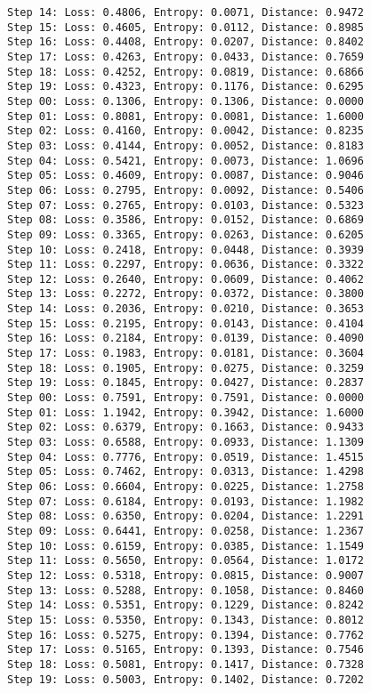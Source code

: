 \documentclass[11pt]{article}
\begin{document}
\begin{Verbatim}[commandchars=\\\{\}]
Step 14: Loss: 0.4806, Entropy: 0.0071, Distance: 0.9472
Step 15: Loss: 0.4605, Entropy: 0.0112, Distance: 0.8985
Step 16: Loss: 0.4408, Entropy: 0.0207, Distance: 0.8402
Step 17: Loss: 0.4263, Entropy: 0.0433, Distance: 0.7659
Step 18: Loss: 0.4252, Entropy: 0.0819, Distance: 0.6866
Step 19: Loss: 0.4323, Entropy: 0.1176, Distance: 0.6295
Step 00: Loss: 0.1306, Entropy: 0.1306, Distance: 0.0000
Step 01: Loss: 0.8081, Entropy: 0.0081, Distance: 1.6000
Step 02: Loss: 0.4160, Entropy: 0.0042, Distance: 0.8235
Step 03: Loss: 0.4144, Entropy: 0.0052, Distance: 0.8183
Step 04: Loss: 0.5421, Entropy: 0.0073, Distance: 1.0696
Step 05: Loss: 0.4609, Entropy: 0.0087, Distance: 0.9046
Step 06: Loss: 0.2795, Entropy: 0.0092, Distance: 0.5406
Step 07: Loss: 0.2765, Entropy: 0.0103, Distance: 0.5323
Step 08: Loss: 0.3586, Entropy: 0.0152, Distance: 0.6869
Step 09: Loss: 0.3365, Entropy: 0.0263, Distance: 0.6205
Step 10: Loss: 0.2418, Entropy: 0.0448, Distance: 0.3939
Step 11: Loss: 0.2297, Entropy: 0.0636, Distance: 0.3322
Step 12: Loss: 0.2640, Entropy: 0.0609, Distance: 0.4062
Step 13: Loss: 0.2272, Entropy: 0.0372, Distance: 0.3800
Step 14: Loss: 0.2036, Entropy: 0.0210, Distance: 0.3653
Step 15: Loss: 0.2195, Entropy: 0.0143, Distance: 0.4104
Step 16: Loss: 0.2184, Entropy: 0.0139, Distance: 0.4090
Step 17: Loss: 0.1983, Entropy: 0.0181, Distance: 0.3604
Step 18: Loss: 0.1905, Entropy: 0.0275, Distance: 0.3259
Step 19: Loss: 0.1845, Entropy: 0.0427, Distance: 0.2837
Step 00: Loss: 0.7591, Entropy: 0.7591, Distance: 0.0000
Step 01: Loss: 1.1942, Entropy: 0.3942, Distance: 1.6000
Step 02: Loss: 0.6379, Entropy: 0.1663, Distance: 0.9433
Step 03: Loss: 0.6588, Entropy: 0.0933, Distance: 1.1309
Step 04: Loss: 0.7776, Entropy: 0.0519, Distance: 1.4515
Step 05: Loss: 0.7462, Entropy: 0.0313, Distance: 1.4298
Step 06: Loss: 0.6604, Entropy: 0.0225, Distance: 1.2758
Step 07: Loss: 0.6184, Entropy: 0.0193, Distance: 1.1982
Step 08: Loss: 0.6350, Entropy: 0.0204, Distance: 1.2291
Step 09: Loss: 0.6441, Entropy: 0.0258, Distance: 1.2367
Step 10: Loss: 0.6159, Entropy: 0.0385, Distance: 1.1549
Step 11: Loss: 0.5650, Entropy: 0.0564, Distance: 1.0172
Step 12: Loss: 0.5318, Entropy: 0.0815, Distance: 0.9007
Step 13: Loss: 0.5288, Entropy: 0.1058, Distance: 0.8460
Step 14: Loss: 0.5351, Entropy: 0.1229, Distance: 0.8242
Step 15: Loss: 0.5350, Entropy: 0.1343, Distance: 0.8012
Step 16: Loss: 0.5275, Entropy: 0.1394, Distance: 0.7762
Step 17: Loss: 0.5165, Entropy: 0.1393, Distance: 0.7546
Step 18: Loss: 0.5081, Entropy: 0.1417, Distance: 0.7328
Step 19: Loss: 0.5003, Entropy: 0.1402, Distance: 0.7202

\end{Verbatim}
\end{document}
